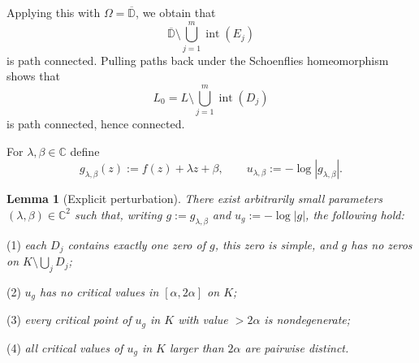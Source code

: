 \documentclass[12pt]{amsart}
\theoremstyle{definition}
\newtheorem{lemma}[theorem]{Lemma}
\theoremstyle{remark}
\begin{document}
Applying this with $\Omega=\overline{\mathbb D}$, we obtain that
\[
\overline{\mathbb D}\setminus \bigcup_{j=1}^m \operatorname{int}(E_j)
\]
is path connected. Pulling paths back under the Schoenflies homeomorphism shows that
\[
L_0
=
L\setminus \bigcup_{j=1}^m \operatorname{int}(D_j)
\]
is path connected, hence connected.

For $\lambda,\beta\in\mathbb{C}$ define
\[
 g_{\lambda,\beta}(z):=f(z)+\lambda z+\beta,\qquad u_{\lambda,\beta}:=-\log|g_{\lambda,\beta}|.
\]

\medskip
\begin{lemma}[Explicit perturbation]\label{lem:explicit-perturbation}
\emph{There exist arbitrarily small parameters $(\lambda,\beta)\in\mathbb{C}^2$ such that,
writing $g:=g_{\lambda,\beta}$ and $u_g:=-\log|g|$, the following hold:}

\noindent (1) \emph{each $D_j$ contains exactly one zero of $g$, this zero is simple, and $g$ has no zeros on
$K\setminus \bigcup_j D_j$;}

\noindent (2) \emph{$u_g$ has no critical values in $[\alpha,2\alpha]$ on $K$;}

\noindent (3) \emph{every critical point of $u_g$ in $K$ with value $>2\alpha$ is nondegenerate;}

\noindent (4) \emph{all critical values of $u_g$ in $K$ larger than $2\alpha$ are pairwise distinct.}
\end{lemma}
\end{document}
